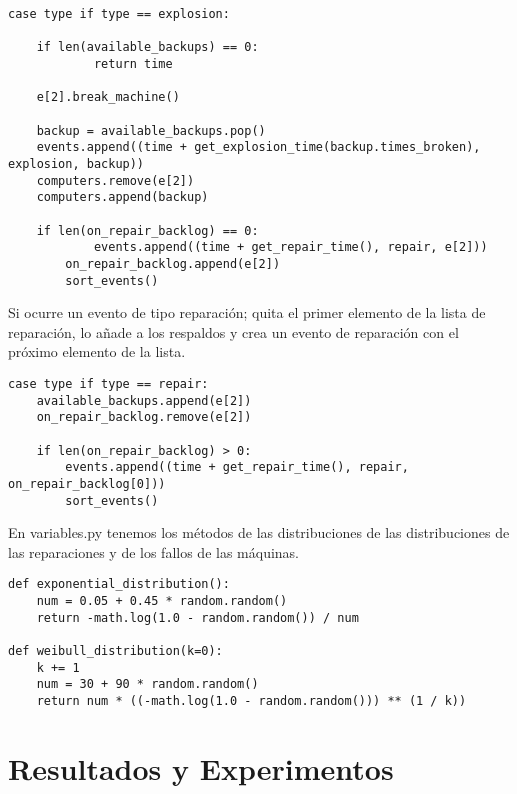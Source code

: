 \documentclass{article}
\begin{document}
\begin{lstlisting}
case type if type == explosion:
               
	if len(available_backups) == 0:
    		return time
                
	e[2].break_machine()

	backup = available_backups.pop()
    events.append((time + get_explosion_time(backup.times_broken), explosion, backup))
	computers.remove(e[2])
	computers.append(backup)

	if len(on_repair_backlog) == 0:
    		events.append((time + get_repair_time(), repair, e[2]))
    	on_repair_backlog.append(e[2])
    	sort_events()
\end{lstlisting}
 
 
 Si ocurre un evento de tipo reparación; quita el primer elemento de la lista de reparación, lo añade a los respaldos y crea un evento de reparación con el próximo elemento de la lista.
 
 \begin{lstlisting}
case type if type == repair:
	available_backups.append(e[2])
	on_repair_backlog.remove(e[2])

	if len(on_repair_backlog) > 0:
		events.append((time + get_repair_time(), repair, on_repair_backlog[0]))
		sort_events()
\end{lstlisting}

 En variables.py tenemos los métodos de las distribuciones de las distribuciones de las reparaciones y de los fallos de las máquinas.

\begin{lstlisting}
def exponential_distribution():
	num = 0.05 + 0.45 * random.random()
    return -math.log(1.0 - random.random()) / num
    
def weibull_distribution(k=0):
	k += 1
    num = 30 + 90 * random.random()
    return num * ((-math.log(1.0 - random.random())) ** (1 / k))
\end{lstlisting}
 

\section{Resultados y Experimentos}
\end{document}
